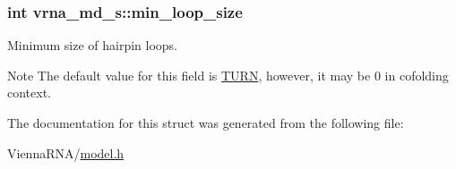 \subsubsection[{\texorpdfstring{min\+\_\+loop\+\_\+size}{min_loop_size}}]{\setlength{\rightskip}{0pt plus 5cm}int vrna\+\_\+md\+\_\+s\+::min\+\_\+loop\+\_\+size}\hypertarget{structvrna__md__s_a9ed7ba42fcc46915c5c0c524f3d255f5}{}\label{structvrna__md__s_a9ed7ba42fcc46915c5c0c524f3d255f5}


Minimum size of hairpin loops. 

\begin{DoxyNote}{Note}
The default value for this field is \hyperlink{energy__const_8h_ae646250fd59311356c7e5722a81c3a96}{T\+U\+RN}, however, it may be 0 in cofolding context. 
\end{DoxyNote}


The documentation for this struct was generated from the following file\+:\begin{DoxyCompactItemize}
\item 
Vienna\+R\+N\+A/\hyperlink{model_8h}{model.\+h}\end{DoxyCompactItemize}
